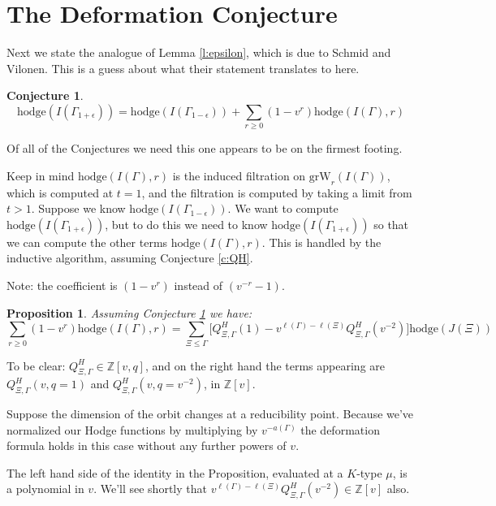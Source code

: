\documentclass[12pt,leqno]{article}
\newtheorem{conjecture}[equation]{Conjecture}
\newtheorem{proposition}[equation]{Proposition}
\newcommand{\hodge}{\text{hodge}}
\newcommand{\w}{\text{grW}}
\newcommand{\Z}{\mathbb Z}
\renewcommand{\sec}[1]{\section{#1}
\renewcommand{\theequation}{\thesection.\arabic{equation}}
  \setcounter{equation}{0}}
\renewcommand{\sec}[1]{\section{#1}
\renewcommand{\theequation}{\thesection.\arabic{equation}}
  \setcounter{equation}{0}}
\begin{document}
\sec{The Deformation Conjecture}
\label{s:deformation}

Next we state the analogue of Lemma \ref{l:epsilon}, which is due to
Schmid and Vilonen. This is a guess about what their statement translates to
here.

\begin{conjecture}
\label{c:deformation}
\normalfont
$$
\hodge(I(\Gamma_{1+\epsilon}))=\hodge(I(\Gamma_{1-\epsilon}))+
\sum_{r\ge 0}(1-v^r)\hodge(I(\Gamma),r)
$$
\end{conjecture}

Of all of the Conjectures we need this one appears to be on the firmest footing.

\begin{remarkplain}
\label{r:deformation}
Keep in mind $\hodge(I(\Gamma),r)$ is the induced filtration on $\w_r(I(\Gamma))$,
which is computed at $t=1$, and the filtration is computed by taking
a limit from $t>1$. Suppose we know $\hodge(I(\Gamma_{1-\epsilon}))$. We
want to compute $\hodge(I(\Gamma_{1+\epsilon}))$, but to do this we need to
know $\hodge(I(\Gamma_{1+\epsilon}))$ so that we can compute the other terms
$\hodge(I(\Gamma),r)$.
This is handled by the inductive algorithm, assuming Conjecture
\ref{c:QH}.

Note: the coefficient is $(1-v^r)$ instead of $(v^{-r}-1)$.
\end{remarkplain}

\begin{proposition}
\label{p:deformationterm_hodge}
Assuming Conjecture \ref{c:deformation} we have:
\normalfont
$$
\sum_{r\ge 0}(1-v^r)\hodge(I(\Gamma),r)=
\sum_{\Xi\le\Gamma}\big[Q^H_{\Xi,\Gamma}(1)-v^{\ell(\Gamma)-\ell(\Xi)}Q^H_{\Xi,\Gamma}(v^{-2})\big]\hodge(J(\Xi))
$$
\end{proposition}

To be clear: $Q^H_{\Xi,\Gamma}\in \Z[v,q]$, and on the right hand
the terms appearing are
$Q^H_{\Xi,\Gamma}(v,q=1)$ and
$Q^H_{\Xi,\Gamma}(v,q=v^{-2})$, in $\Z[v]$.


\begin{remarkplain}
Suppose the dimension of the orbit changes at a reducibility point. Because we've normalized
our Hodge functions by multiplying by $v^{-a(\Gamma)}$ the deformation formula holds in this case without any
further powers of $v$.
\end{remarkplain}

\begin{remarkplain}
The left hand side of the identity in the Proposition, evaluated at a $K$-type $\mu$,  is a polynomial in $v$.
We'll see shortly that $v^{\ell(\Gamma)-\ell(\Xi)}Q^H_{\Xi,\Gamma}(v^{-2})\in\Z[v]$ also.
\end{remarkplain}
\medskip
\end{document}
